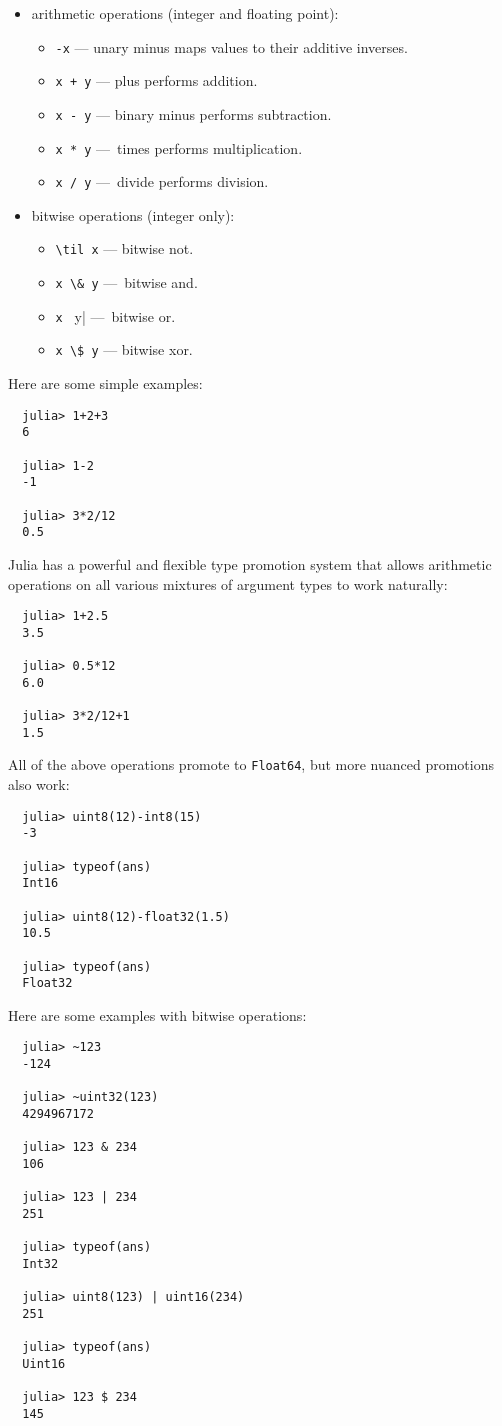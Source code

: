 \documentclass{article}
\newcommand{\til}{\raise.17ex\hbox{$\scriptstyle\sim$}}
\begin{document}
\begin{itemize}
  \item arithmetic operations (integer and floating point):
  \begin{itemize}
    \item \verb|-x| — unary minus maps values to their additive inverses.
    \item \verb|x + y| — plus performs addition.
    \item \verb|x - y| — binary minus performs subtraction.
    \item \verb|x * y| — times performs multiplication.
    \item \verb|x / y| — divide performs division.
  \end{itemize}
  \item bitwise operations (integer only):
  \begin{itemize}
    \item \verb|\til x| — bitwise not.
    \item \verb|x \& y| — bitwise and.
    \item \verb|x | y| — bitwise or.
    \item \verb|x \$ y| — bitwise xor.
  \end{itemize}
\end{itemize}
Here are some simple examples:
\begin{verbatim}
  julia> 1+2+3
  6

  julia> 1-2
  -1

  julia> 3*2/12
  0.5
\end{verbatim}
Julia has a powerful and flexible type promotion system that allows arithmetic operations on all various mixtures of argument types to work naturally:
\begin{verbatim}
  julia> 1+2.5
  3.5

  julia> 0.5*12
  6.0

  julia> 3*2/12+1
  1.5
\end{verbatim}
All of the above operations promote to \verb|Float64|, but more nuanced promotions also work:
\begin{verbatim}
  julia> uint8(12)-int8(15)
  -3

  julia> typeof(ans)
  Int16

  julia> uint8(12)-float32(1.5)
  10.5

  julia> typeof(ans)
  Float32
\end{verbatim}
Here are some examples with bitwise operations:
\begin{verbatim}
  julia> ~123
  -124

  julia> ~uint32(123)
  4294967172

  julia> 123 & 234
  106

  julia> 123 | 234
  251

  julia> typeof(ans)
  Int32

  julia> uint8(123) | uint16(234)
  251

  julia> typeof(ans)
  Uint16

  julia> 123 $ 234
  145
\end{verbatim}
\end{document}
